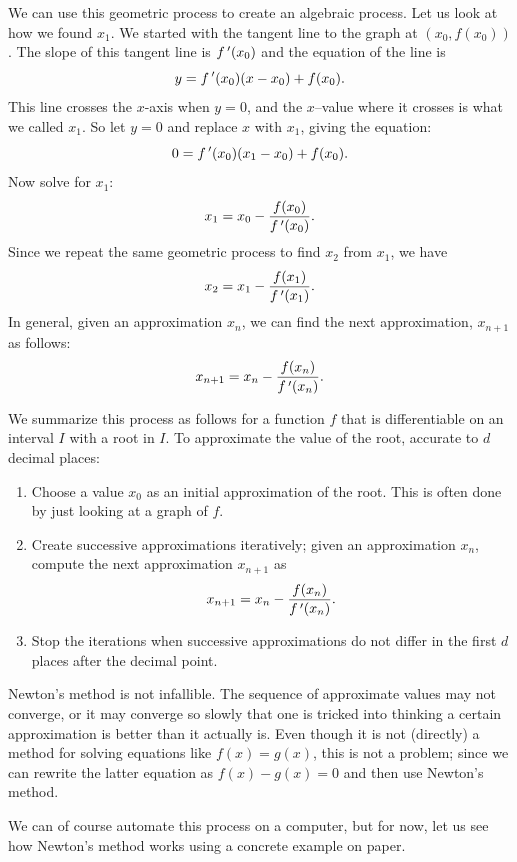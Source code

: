We can use this geometric process to create an algebraic process.  Let us look at how we found $x_1$.  We started with the tangent line to the graph at $(x_0,f(x_0))$.  The slope of this tangent line is $f\,'(x_0)$ and the equation of the line is
$$y=f\,'(x_0)(x-x_0)+f(x_0).$$
This line crosses the $x$-axis when $y=0$, and the $x$--value where it crosses is what we called $x_1$. So let $y=0$ and replace $x$ with $x_1$, giving the equation: 
$$ 0 = f\,'(x_0)(x_1-x_0)+f(x_0).$$ 
Now solve for $x_1$:
$$x_1=x_0-\frac{f(x_0)}{f\,'(x_0)}.$$
Since we repeat the same geometric process to find $x_2$ from $x_1$, we have
$$x_2=x_1-\frac{f(x_1)}{f\,'(x_1)}.$$
In general, given an approximation $x_n$, we can find the next approximation, $x_{n+1}$ as follows:
$$x_{n+1} = x_{n} - \frac{f(x_{n})}{f\,'(x_{n})}.$$

We summarize this process as follows for a function $f$ that is differentiable on an interval $I$ with a root in $I$. To approximate the value of the root, accurate to $d$ decimal places:
	\begin{enumerate}
	\item		Choose a value $x_0$ as an initial approximation of the root. This is often done by just looking at a graph of $f$.
	\item		Create successive approximations iteratively; given an approximation $x_n$, compute the next approximation $x_{n+1}$ as $$x_{n+1} = x_n - \frac{f(x_n)}{f\,'(x_n)}.$$
	\item		Stop the iterations when successive approximations do not differ in the first $d$ places after the decimal point.
		\end{enumerate}
Newton's method is not infallible. The sequence of approximate values may not converge, or it may converge so slowly that one is tricked into thinking a certain approximation is better than it actually is. Even though it is not (directly) a method for solving equations like $f(x) = g(x)$, this is not a problem; since we can rewrite the latter equation as $f(x) - g(x)=0$ and then use Newton's method. 

We can of course automate this process on a computer, but for now, let us see how Newton's method works using a concrete example on paper.

